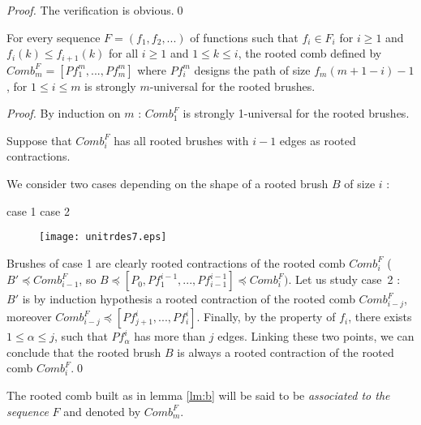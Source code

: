 \documentclass{llncs}
\begin{document}
\begin{proof}The verification is obvious.\qed
\end{proof}





\begin{lemma}\label{lm:b} For every sequence $F = \left( {f_1 ,f_2 ,...} \right)$
of functions such that $f_i \in F_i $ for $i \ge 1$ and $f_i \left( k
\right) \le f_{i + 1} \left( k \right)$ for all $i \ge 1$ and $1 \le k \le
i$, the rooted comb defined by $Comb_m^F = \left[ {Pf_1^m ,...,Pf_m^m }
\right]$ where $Pf_i^m $ designs the path of size $f_m (m + 1 - i) - 1$, for
$1 \le i \le m$ is strongly $m$-universal for the rooted brushes.
\end{lemma}




\begin{proof} By induction on $m$ : $Comb_1^F $ is strongly
1-universal for the rooted brushes.

Suppose that $Comb_i^F $ has all rooted brushes with $i - 1$ edges
as rooted contractions.

We consider two cases depending on the shape of a rooted brush $B$ of size
$i$ :

\hspace{1.7cm} case 1 \hspace{4cm} case 2
\begin{figure}[htbp]
\centerline{\texttt{[image: unitrdes7.eps]}}
\end{figure}


Brushes of case 1 are clearly rooted contractions of the rooted
comb $Comb_i^F $ (${B}'\preceq Comb_{i - 1}^F $, so $B\preceq
\left[ {P_0 ,Pf_1^{i - 1} ,...,Pf_{i - 1}^{i - 1} } \right]\preceq
Comb_i^F )$. Let us study case~2 : $B'$ is by induction hypothesis
a rooted contraction of the rooted comb $Comb_{i - j}^F $,
moreover $Comb_{i - j}^F \preceq \left[ {Pf_{j + 1}^i ,...,Pf_i^i
} \right].$ Finally, by the property of $f_i $, there exists $1
\le \alpha \le j$, such that $Pf_\alpha ^i $ has more than $j$
edges. Linking these two points, we can conclude that the rooted
brush $B$ is always a rooted contraction of the rooted comb
$Comb_i^F $.\qed
\end{proof}





The rooted comb built as in lemma \ref{lm:b} will be said to be
\textit{associated to the sequence} $F$ and denoted by $Comb_m^F
$.
\end{document}

